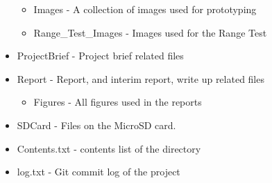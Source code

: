\begin{itemize}
\begin{itemize}
\item Images - A collection of images used for prototyping
\item Range\_Test\_Images - Images used for the Range Test
\end{itemize}
\item ProjectBrief - Project brief related files
\item Report - Report, and interim report, write up related files
\begin{itemize}
\item Figures - All figures used in the reports
\end{itemize}
\item SDCard - Files on the MicroSD card. 
\item Contents.txt - contents list of the directory
\item log.txt - Git commit log of the project
\end{itemize} 
        
